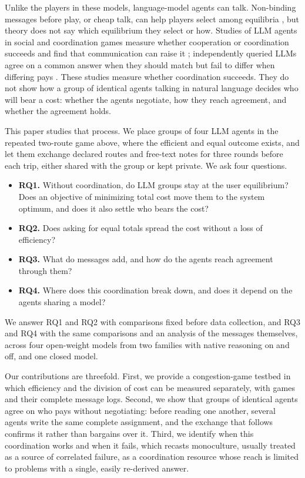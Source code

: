 \documentclass[11pt]{article}
\begin{document}
Unlike the players in these models, language-model agents can talk. Non-binding messages before play, or cheap talk, can help players select among equilibria \citep{farrell1996_cheap_talk,cooper1992_communication}, but theory does not say which equilibrium they select or how. Studies of LLM agents in social and coordination games measure whether cooperation or coordination succeeds \citep{piatti2024_govsim,agashe2025_llm_coordination} and find that communication can raise it \citep{piatti2024_govsim,madmoun2026_communication}; independently queried LLMs agree on a common answer when they should match but fail to differ when differing pays \citep{ballestero2026_monoculture}. These studies measure whether coordination succeeds. They do not show how a group of identical agents talking in natural language decides who will bear a cost: whether the agents negotiate, how they reach agreement, and whether the agreement holds.

This paper studies that process. We place groups of four LLM agents in the repeated two-route game above, where the efficient and equal outcome exists, and let them exchange declared routes and free-text notes for three rounds before each trip, either shared with the group or kept private. We ask four questions.
\begin{itemize}[leftmargin=*,itemsep=1pt,topsep=2pt]
\item \textbf{RQ1.} Without coordination, do LLM groups stay at the user equilibrium? Does an objective of minimizing total cost move them to the system optimum, and does it also settle who bears the cost?
\item \textbf{RQ2.} Does asking for equal totals spread the cost without a loss of efficiency?
\item \textbf{RQ3.} What do messages add, and how do the agents reach agreement through them?
\item \textbf{RQ4.} Where does this coordination break down, and does it depend on the agents sharing a model?
\end{itemize}
We answer RQ1 and RQ2 with comparisons fixed before data collection, and RQ3 and RQ4 with the same comparisons and an analysis of the messages themselves, across four open-weight models from two families with native reasoning on and off, and one closed model.

Our contributions are threefold. First, we provide a congestion-game testbed in which efficiency and the division of cost can be measured separately, with \AllValidWithLuna{} games and their complete message logs. Second, we show that groups of identical agents agree on who pays without negotiating: before reading one another, several agents write the same complete assignment, and the exchange that follows confirms it rather than bargains over it. Third, we identify when this coordination works and when it fails, which recasts monoculture, usually treated as a source of correlated failure, as a coordination resource whose reach is limited to problems with a single, easily re-derived answer.
\end{document}
